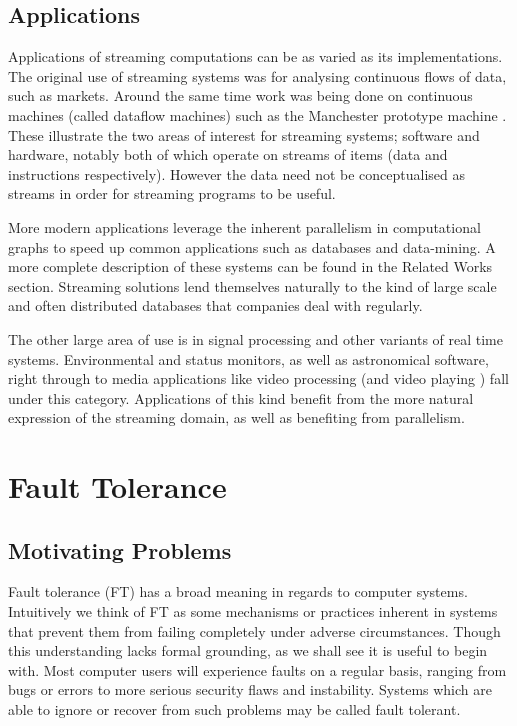 \subsection{Applications}

Applications of streaming computations can be as varied as its implementations.
The original use of streaming systems was for analysing continuous flows of data, such as markets.
Around the same time work was being done on continuous machines (called dataflow machines) such as the Manchester prototype machine \cite{gur85}.
These illustrate the two areas of interest for streaming systems; software and hardware, notably both of which operate on streams of items (data and instructions respectively).
However the data need not be conceptualised as streams in order for streaming programs to be useful.

More modern applications leverage the inherent parallelism in computational graphs to speed up common applications such as databases and data-mining.
A more complete description of these systems can be found in the Related Works section.
Streaming solutions lend themselves naturally to the kind of large scale and often distributed databases that companies deal with regularly.

The other large area of use is in signal processing and other variants of real time systems.
Environmental and status monitors, as well as astronomical software, right through to media applications like video processing (and video playing \cite{thies02}) fall under this category.
Applications of this kind benefit from the more natural expression of the streaming domain, as well as benefiting from parallelism.

\section{Fault Tolerance}
\subsection{Motivating Problems}
Fault tolerance (FT) has a broad meaning in regards to computer systems.
Intuitively we think of FT as some mechanisms or practices inherent in systems that prevent them from failing completely under adverse circumstances.
Though this understanding lacks formal grounding, as we shall see it is useful to begin with.
Most computer users will experience faults on a regular basis, ranging from bugs or errors to more serious security flaws and instability.
Systems which are able to ignore or recover from such problems may be called fault tolerant.

